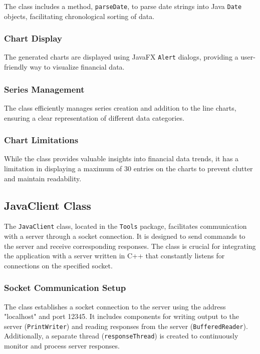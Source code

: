\documentclass{article}
\begin{document}
The class includes a method, \texttt{parseDate}, to parse date strings into Java \texttt{Date} objects, facilitating chronological sorting of data.

\subsubsection{Chart Display}

The generated charts are displayed using JavaFX \texttt{Alert} dialogs, providing a user-friendly way to visualize financial data.

\subsubsection{Series Management}

The class efficiently manages series creation and addition to the line charts, ensuring a clear representation of different data categories.

\subsubsection{Chart Limitations}

While the class provides valuable insights into financial data trends, it has a limitation in displaying a maximum of 30 entries on the charts to prevent clutter and maintain readability.

\subsection{JavaClient Class}\label{java-client}

The \texttt{JavaClient} class, located in the \texttt{Tools} package, facilitates communication with a server through a socket connection. It is designed to send commands to the server and receive corresponding responses. The class is crucial for integrating the application with a server written in C++ that constantly listens for connections on the specified socket.

\subsubsection{Socket Communication Setup}

The class establishes a socket connection to the server using the address "localhost" and port 12345. It includes components for writing output to the server (\texttt{PrintWriter}) and reading responses from the server (\texttt{BufferedReader}). Additionally, a separate thread (\texttt{responseThread}) is created to continuously monitor and process server responses.
\end{document}
